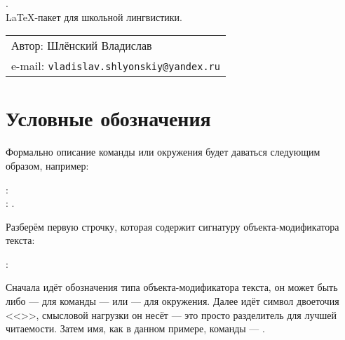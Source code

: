 \newpage 

\thispagestyle{empty}

\vspace*{7cm}
\begin{center}
    { \huge {}. } \\
    { \Large \LaTeX-пакет для школьной лингвистики. }\\
\end{center}


\vspace*{7cm}
\begin{flushright}
    \begin{tabular}{@{}l@{}}
        Автор: Шлёнский Владислав \\
        e-mail: \texttt{vladislav.shlyonskiy@yandex.ru}
    \end{tabular}
\end{flushright}


\newpage

\tableofcontents

\newpage




\section{Условные обозначения}

Формально описание команды или окружения будет даваться следующим образом, например:
\begin{tcolorbox}
    \small \rsTypeAux: \\
    \hspace*{1cm} \rsOptionsAux: . 
\end{tcolorbox}

Разберём первую строчку, которая содержит сигнатуру объекта-модификатора текста:
\begin{center}
    \rsTypeAux:
\end{center}
Сначала идёт обозначения типа объекта-модификатора текста, он может быть либо \rsTypeAux\space --- для команды --- или \rsTypeAux[env] --- для окружения. Далее идёт символ двоеточия <<\rsCodeAux{:}>>, смысловой нагрузки он несёт --- это просто разделитель для лучшей читаемости. Затем имя, как в данном примере, команды --- . 

